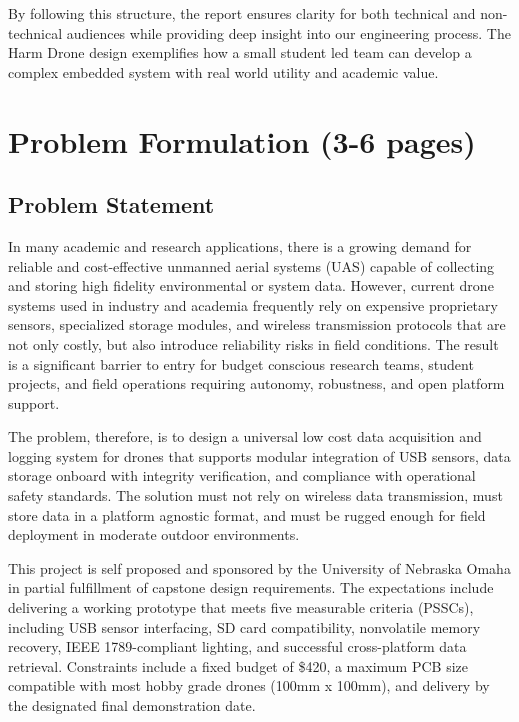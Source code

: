 \documentclass[12pt]{article}
\begin{document}
By following this structure, the report ensures clarity for both technical and non-technical audiences while providing deep insight into our engineering process. The Harm Drone design exemplifies how a small student led team can develop a complex embedded system with real world utility and academic value.



\section{Problem Formulation (3-6 pages)}
\subsection{Problem Statement}
\par In many academic and research applications, there is a growing demand for reliable and cost-effective unmanned aerial systems (UAS) capable of collecting and storing high fidelity environmental or system data. However, current drone systems used in industry and academia frequently rely on expensive proprietary sensors, specialized storage modules, and wireless transmission protocols that are not only costly, but also introduce reliability risks in field conditions. The result is a significant barrier to entry for budget conscious research teams, student projects, and field operations requiring autonomy, robustness, and open platform support.

\par The problem, therefore, is to design a universal low cost data acquisition and logging system for drones that supports modular integration of USB sensors, data storage onboard with integrity verification, and compliance with operational safety standards. The solution must not rely on wireless data transmission, must store data in a platform agnostic format, and must be rugged enough for field deployment in moderate outdoor environments.

\par This project is self proposed and sponsored by the University of Nebraska Omaha in partial fulfillment of capstone design requirements. The expectations include delivering a working prototype that meets five measurable criteria (PSSCs), including USB sensor interfacing, SD card compatibility, nonvolatile memory recovery, IEEE 1789-compliant lighting, and successful cross-platform data retrieval. Constraints include a fixed budget of \$420, a maximum PCB size compatible with most hobby grade drones (100mm x 100mm), and delivery by the designated final demonstration date.
\end{document}
